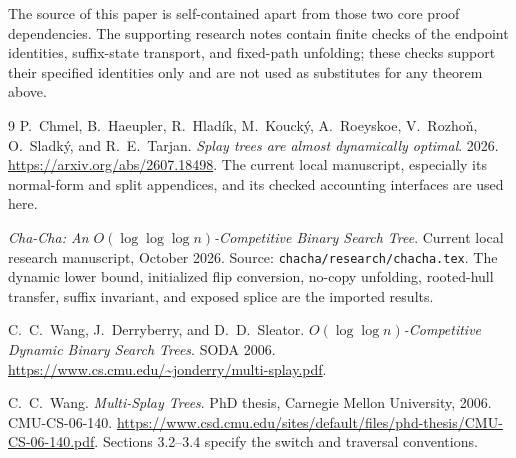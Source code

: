 \documentclass[11pt]{article}
\numberwithin{equation}{section}
\begin{document}
The source of this paper is self-contained apart from those two core
proof dependencies. The supporting research notes contain finite checks
of the endpoint identities, suffix-state transport, and fixed-path
unfolding; these checks support their specified identities only and
are not used as substitutes for any theorem above.

\begin{thebibliography}{9}
P.~Chmel, B.~Haeupler, R.~Hlad\'ik, M.~Kouck\'y, A.~Roeyskoe,
V.~Rozho\v{n}, O.~Sladk\'y, and R.~E.~Tarjan.
\emph{Splay trees are almost dynamically optimal}.
2026. \url{https://arxiv.org/abs/2607.18498}.
The current local manuscript, especially its normal-form and split
appendices, and its checked accounting interfaces are used here.

\emph{Cha-Cha: An $O(\log\log\log n)$-Competitive Binary
Search Tree}. Current local research manuscript, October 2026.
Source: \texttt{chacha/research/chacha.tex}.
The dynamic lower bound, initialized flip conversion, no-copy unfolding,
rooted-hull transfer, suffix invariant, and exposed splice are the
imported results.

C.~C.~Wang, J.~Derryberry, and D.~D.~Sleator.
\emph{$O(\log\log n)$-Competitive Dynamic Binary Search Trees}.
SODA 2006.
\url{https://www.cs.cmu.edu/~jonderry/multi-splay.pdf}.

C.~C.~Wang. \emph{Multi-Splay Trees}. PhD thesis,
Carnegie Mellon University, 2006. CMU-CS-06-140.
\url{https://www.csd.cmu.edu/sites/default/files/phd-thesis/CMU-CS-06-140.pdf}.
Sections 3.2--3.4 specify the switch and traversal conventions.
\end{thebibliography}
\end{document}
